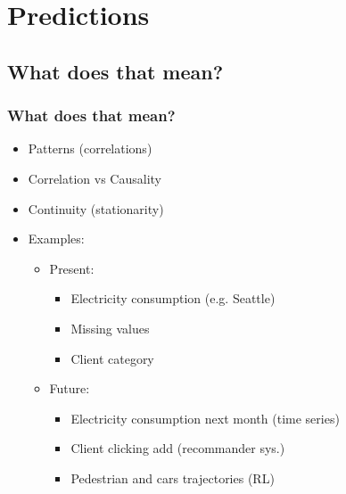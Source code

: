 



\begin{frame}
   \titlepage
\end{frame}



\begin{frame}
   \tableofcontents
\end{frame}

\section{Predictions}


\subsection{What does that mean?}

\begin{frame}\frametitle{What does that mean?}
   \begin{itemize}
      \item Patterns (correlations)
      \item Correlation vs Causality
      \item Continuity (stationarity)
      \item Examples:
      \begin{itemize}
         \item Present:
         \begin{itemize}
            \item Electricity consumption (e.g. Seattle)
            \item Missing values
            \item Client category
         \end{itemize}
         \item Future:
         \begin{itemize}
            \item Electricity consumption next month (time series)
            \item Client clicking add (recommander sys.)
            \item Pedestrian and cars trajectories (RL)
         \end{itemize}
      \end{itemize}
   \end{itemize}
\end{frame}


